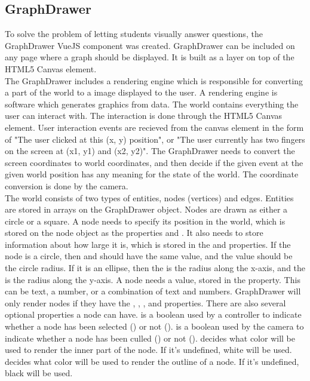 \subsection{GraphDrawer}
To solve the problem of letting students visually answer questions, the GraphDrawer VueJS component was created. GraphDrawer can be included on any page where a graph should be displayed. It is built as a layer on top of the HTML5 Canvas element.
\\[11pt]
The GraphDrawer includes a rendering engine which is responsible for converting a part of the world to a image displayed to the user. A rendering engine is software which generates graphics from data. The world contains everything the user can interact with. The interaction is done through the HTML5 Canvas element. User interaction events are recieved from the canvas element in the form of "The user clicked at this (x, y) position", or "The user currently has two fingers on the screen at (x1, y1) and (x2, y2)". The GraphDrawer needs to convert the screen coordinates to world coordinates, and then decide if the given event at the given world position has any meaning for the state of the world. The coordinate conversion is done by the camera.
\\[11pt]
The world consists of two types of entities, nodes (vertices) and edges. Entities are stored in arrays on the GraphDrawer object. Nodes are drawn as either a circle or a square. A node needs to specify its position in the world, which is stored on the node object as the properties  and . It also needs to store information about how large it is, which is stored in the  and  properties. If the node is a circle, then  and  should have the same value, and the value should be the circle radius. If it is an ellipse, then the  is the radius along the x-axis, and the  is the radius along the y-axis. A node needs a value, stored in the  property. This can be text, a number, or a combination of text and numbers. GraphDrawer will only render nodes if they have the , , ,  and  properties. There are also several optional properties a node can have.  is a boolean used by a controller to indicate whether a node has been selected () or not ().  is a boolean used by the camera to indicate whether a node has been culled () or not ().  decides what color will be used to render the inner part of the node. If it's undefined, white will be used.  decides  what color will be used to render the outline of a node. If it's undefined, black will be used.
